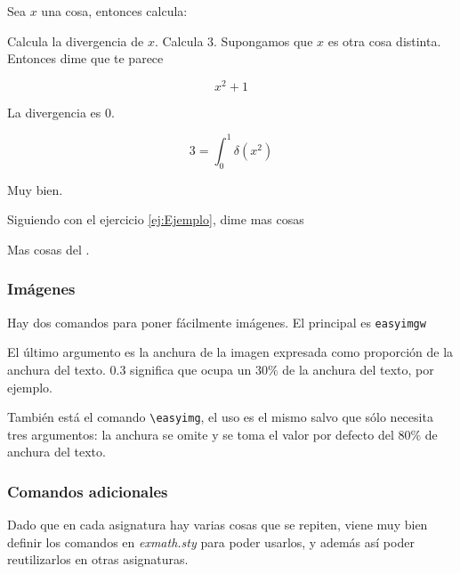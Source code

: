 \begin{LTXexample}[pos=r]
\begin{problem}[3] \label{ej:Ejemplo}
Sea $x$ una cosa, entonces calcula:

\ppart Calcula la divergencia de $x$.
\ppart Calcula 3.
\ppart Supongamos que $x$ es otra cosa distinta. Entonces dime que te parece

\[ x^2 + 1 \]

\solution

\spart La divergencia es 0.

\spart

\[ 3 = \int_0^1 \delta(x^2) \]

\spart Muy bien.

\end{problem}

\begin{problemS}
Siguiendo con el ejercicio \ref{ej:Ejemplo}, dime mas cosas

\solution

\spart Mas cosas del .
\end{problemS}
\end{LTXexample}

\subsubsection{Imágenes}

Hay dos comandos para poner fácilmente imágenes. El principal es \texttt{easyimgw}

\begin{LTXexample}[pos=r]
\end{LTXexample}

El último argumento es la anchura de la imagen expresada como proporción de la anchura del texto. $0.3$ significa que ocupa un $30\%$ de la anchura del texto, por ejemplo.

También está el comando \verb|\easyimg|, el uso es el mismo salvo que sólo necesita tres argumentos: la anchura se omite y se toma el valor por defecto del $80\%$ de anchura del texto.

\subsubsection{Comandos adicionales}
\label{sec:ComandosAdicionales}

Dado que en cada asignatura hay varias cosas que se repiten, viene muy bien definir los comandos en \textit{exmath.sty} para poder usarlos, y además así poder reutilizarlos en otras asignaturas.

